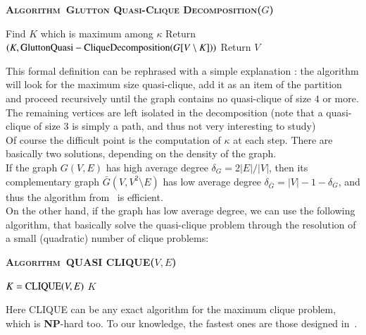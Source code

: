 \documentclass{elsarticle}
\newcommand{\algo}[1]{\textsc{Algorithm~#1}}
\begin{document}
\begin{algorithm}[ht!]
\textbf{\algo{Glutton Quasi-Clique Decomposition}($G$)}
\label{algo:glutton}
\begin{algorithmic}[1]
        \STATE Find $K$ which is maximum among $\kappa$
        \STATE Return $(K,{\rm Glutton Quasi-Clique Decomposition}(G[V\setminus K]))$
    \ELSE
    	\STATE Return $V$
    \ENDIF
\end{algorithmic}
\end{algorithm}

This formal definition can be rephrased with a simple explanation : the algorithm will look for the maximum size quasi-clique, add it as an item of the partition and proceed recursively until the graph contains no quasi-clique of size $4$ or more. The remaining vertices are left isolated in the decomposition (note that a quasi-clique of size $3$ is simply a path, and thus not very interesting to study)\\

Of course the difficult point is the computation of $\kappa$ at each step. There are basically two solutions, depending on the density of the graph.\\

If the graph $G(V,E)$ has high average degree $\delta_G = 2|E|/|V|$, then its complementary graph $\bar{G}(V,V^2\setminus E)$ has low average degree $\delta_{\bar{G}} = |V|-1-\delta_G$, and thus the algorithm from~\cite{qis} is efficient.\\

On the other hand, if the graph has low average degree, we can use the following algorithm, that basically solve the quasi-clique problem through the resolution of a small (quadratic) number of clique problems:

\begin{algorithm}[ht!]
\textbf{\algo{QUASI CLIQUE}($V,E$)}
\label{algo:param}
\begin{algorithmic}[1]
	\STATE $K = {\rm CLIQUE}(V,E)$
	\ENDFOR
	\RETURN $K$
\end{algorithmic}
\end{algorithm}

Here CLIQUE can be any exact algorithm for the maximum clique problem, which is \textbf{NP}-hard too. To our knowledge, the fastest ones are those designed in~\cite{exactis}.\\
\end{document}
